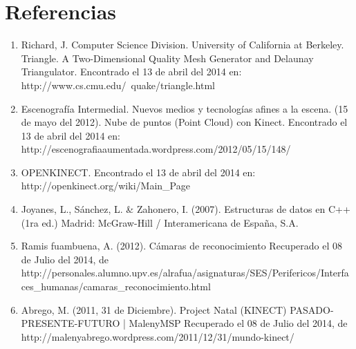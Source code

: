 \documentclass[letterpaper]{article}
\begin{document}
\section{Referencias}

\begin{enumerate}

\item Richard, J. Computer Science Division. University of California at Berkeley. Triangle. A Two-Dimensional Quality Mesh Generator and 
Delaunay Triangulator. Encontrado el 13 de abril del 2014 en: http://www.cs.cmu.edu/~quake/triangle.html
\item Escenografía Intermedial. Nuevos medios y tecnologías afines a la escena. (15 de mayo del 2012).
Nube de puntos (Point Cloud) con Kinect. Encontrado el 13 de abril del 2014 en: http://escenografiaaumentada.wordpress.com/2012/05/15/148/
\item OPENKINECT. Encontrado el 13 de abril del 2014 en: http://openkinect.org/wiki/Main\_Page
\item Joyanes, L., Sánchez, L. \& Zahonero, I. (2007). Estructuras de datos en C++ (1ra ed.) Madrid: McGraw-Hill / Interamericana de España, S.A.
\item Ramis fuambuena, A. (2012). Cámaras de reconocimiento Recuperado el 08 de Julio del 2014, de http://personales.alumno.upv.es/alrafua/asignaturas/SES/Perifericos/Interfaces\_humanas/camaras\_reconocimiento.html
\item Abrego, M. (2011, 31 de Diciembre). Project Natal (KINECT) PASADO-PRESENTE-FUTURO | MalenyMSP Recuperado el 08 de Julio del 2014, de http://malenyabrego.wordpress.com/2011/12/31/mundo-kinect/


\end{enumerate}

	
\end{document}

